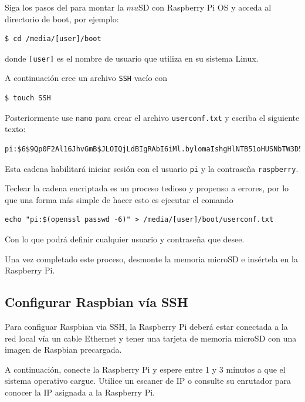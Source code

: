 \documentclass[letterpaper,10.5pt]{article}
\begin{document}
Siga los pasos del  para montar la $mu$SD con Raspberry Pi OS y acceda al directorio de boot, por ejemplo:

\begin{Verbatim}[fontsize=\footnotesize]
$ cd /media/[user]/boot
\end{Verbatim}

\noindent donde \texttt{[user]} es el nombre de usuario que utiliza en su sistema Linux.

A continuación cree un archivo \texttt{SSH} vacío con
\begin{Verbatim}[fontsize=\scriptsize]
$ touch SSH
\end{Verbatim}
\noindent
Posteriormente use \texttt{nano} para crear el archivo \texttt{userconf.txt} y escriba el siguiente texto:
\begin{Verbatim}[fontsize=\scriptsize]
pi:$6$9Qp0F2Al16JhvGmB$JLOIQjLdBIgRAbI6iMl.bylomaIshgHlNTB51oHUSNbTW3D5l6hEnPr6HEBtMo/0IKwlGkc7.FlFOhaMwPKB1/
\end{Verbatim}

Esta cadena habilitará iniciar sesión con el usuario \texttt{pi} y la contraseña \texttt{raspberry}.

Teclear la cadena encriptada es un proceso tedioso y propenso a errores, por lo que una forma más simple de hacer esto es ejecutar el comando

\begin{Verbatim}[fontsize=\footnotesize]
echo "pi:$(openssl passwd -6)" > /media/[user]/boot/userconf.txt
\end{Verbatim}

Con lo que podrá definir cualquier usuario y contraseña que desee.

Una vez completado este proceso, desmonte la memoria microSD e insértela en la Raspberry Pi.




\subsection{Configurar Raspbian vía SSH}
Para configuar Raspbian via SSH, la Raspberry Pi deberá estar conectada a la red local vía un cable Ethernet y tener una tarjeta de memoria microSD con una imagen de Raspbian precargada.

A continuación, conecte la Raspberry Pi y espere entre 1 y 3 minutos a que el sistema operativo cargue.
Utilice un escaner de IP o consulte su enrutador para conocer la IP asignada a la Raspberry Pi.
\end{document}
